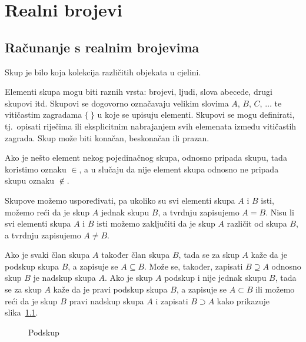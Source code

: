 \chapter{Realni brojevi}\label{ch:realni-brojevi}

\section{Računanje s realnim brojevima}\label{sec:računanje-s-realnim-brojevima}

Skup je bilo koja kolekcija različitih objekata u cjelini.

Elementi skupa mogu biti raznih vrsta: brojevi, ljudi, slova abecede, drugi skupovi itd.
Skupovi se dogovorno označavaju velikim slovima $A$, $B$, $C$, $\ldots$ te vitičastim zagradama $\{\ \}$ u koje se upisuju elementi.
Skupovi se mogu definirati, tj.\ opisati riječima ili eksplicitnim nabrajanjem svih elemenata između vitičastih zagrada.
Skup može biti konačan, beskonačan ili prazan.

Ako je nešto element nekog pojedinačnog skupa, odnosno pripada skupu, tada koristimo oznaku $\in$, a u slučaju da nije element skupa odnosno ne pripada skupu oznaku $\notin$.

Skupove možemo uspoređivati, pa ukoliko su svi elementi skupa $A$ i $B$ isti, možemo reći da je skup $A$ jednak skupu $B$, a tvrdnju zapisujemo $A = B$.
Nisu li svi elementi skupa $A$ i $B$ isti možemo zaključiti da je skup $A$ različit od skupa $B$, a tvrdnju zapisujemo $A \neq B$.

Ako je svaki član skupa $A$ također član skupa $B$, tada se za skup $A$ kaže da je podskup skupa $B$, a zapisuje se $A \subseteq B$.
Može se, također, zapisati $B \supseteq A$ odnosno skup $B$ je nadskup skupa $A$.
Ako je skup $A$ podskup i nije jednak skupu $B$, tada se za skup $A$ kaže da je pravi podskup skupa $B$, a zapisuje se $A \subset B$ ili možemo reći da je skup $B$ pravi nadskup skupa $A$ i zapisati $B \supset A$ kako prikazuje slika~\ref{fig:podskup}.

\begin{figure}[ht]
\begin{center}\vspace{0.25cm}
\end{center}
\caption{Podskup}\label{fig:podskup}
\end{figure}

